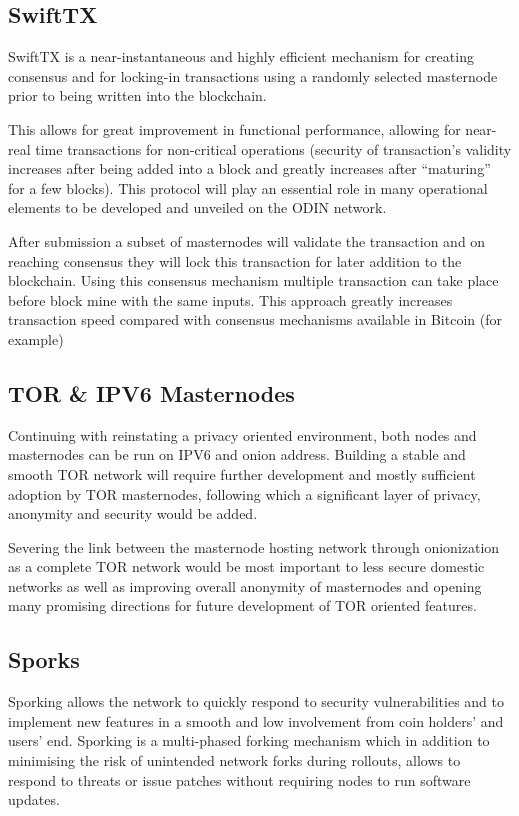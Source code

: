 \documentclass[12pt,letterpaper]{article}
\begin{document}
\subsection{SwiftTX}
SwiftTX is a near-instantaneous and highly efficient mechanism for creating consensus and for locking-in transactions using a randomly selected masternode prior to being written into the blockchain.

This allows for great improvement in functional performance, allowing for near-real time transactions for non-critical operations (security of transaction's validity increases after being added into a block and greatly increases after ``maturing'' for a few blocks). This protocol will play an essential role in many operational elements to be developed and unveiled on the ODIN network.

After submission a subset of masternodes will validate the transaction and on reaching consensus they will lock this transaction for later addition to the blockchain.  Using this consensus mechanism multiple transaction can take place before block mine with the same inputs.  This approach greatly increases transaction speed compared with consensus mechanisms available in Bitcoin (for example)

\subsection{TOR \& IPV6 Masternodes}
Continuing with reinstating a privacy oriented environment, both nodes and masternodes can be run on IPV6 and onion address. Building a stable and smooth TOR network will require further development and mostly sufficient adoption by TOR masternodes, following which a significant layer of privacy, anonymity and security would be added.

Severing the link between the masternode hosting network through onionization as a complete TOR network would be most important to less secure domestic networks as well as improving overall anonymity of masternodes and opening many promising directions for future development of TOR oriented features.

\subsection{Sporks}
Sporking allows the network to quickly respond to security vulnerabilities and to implement new features in a smooth and low involvement from coin holders' and users' end.  Sporking is a multi-phased forking mechanism which in addition to minimising the risk of unintended network forks during rollouts, allows to respond to threats or issue patches without requiring nodes to run software updates.
\end{document}
